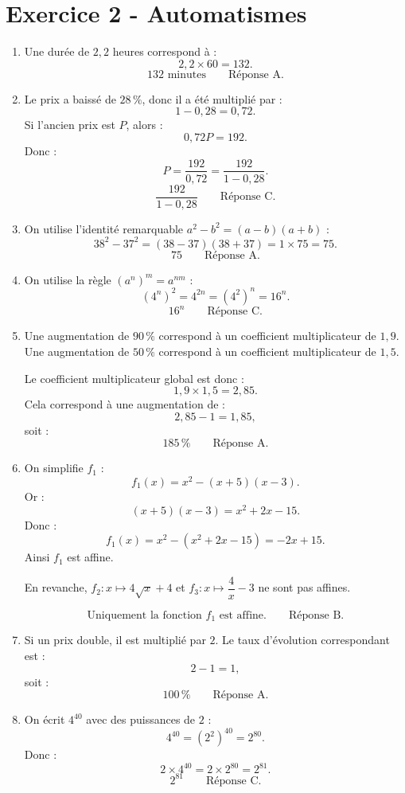 \documentclass[11pt,a4paper]{article}
\begin{document}
\newpage

\section*{Exercice 2 - Automatismes}

\begin{enumerate}[label=\textbf{\arabic*)}, leftmargin=0.75cm, itemsep=0.55cm]

\item Une durée de $2{,}2$ heures correspond à :
\[
2{,}2\times 60=132.
\]
\[
\boxed{132\text{ minutes}} \qquad \text{Réponse A.}
\]

\item Le prix a baissé de $28\,\%$, donc il a été multiplié par :
\[
1-0{,}28=0{,}72.
\]
Si l'ancien prix est $P$, alors :
\[
0{,}72P=192.
\]
Donc :
\[
P=\frac{192}{0{,}72}=\frac{192}{1-0{,}28}.
\]
\[
\boxed{\dfrac{192}{1-0{,}28}} \qquad \text{Réponse C.}
\]

\item On utilise l'identité remarquable $a^2-b^2=(a-b)(a+b)$ :
\[
38^2-37^2=(38-37)(38+37)=1\times75=75.
\]
\[
\boxed{75} \qquad \text{Réponse A.}
\]

\item On utilise la règle $(a^n)^m=a^{nm}$ :
\[
(4^n)^2=4^{2n}=(4^2)^n=16^n.
\]
\[
\boxed{16^n} \qquad \text{Réponse C.}
\]

\item Une augmentation de $90\,\%$ correspond à un coefficient multiplicateur de $1{,}9$.
Une augmentation de $50\,\%$ correspond à un coefficient multiplicateur de $1{,}5$.

Le coefficient multiplicateur global est donc :
\[
1{,}9\times1{,}5=2{,}85.
\]
Cela correspond à une augmentation de :
\[
2{,}85-1=1{,}85,
\]
soit :
\[
\boxed{185\,\%} \qquad \text{Réponse A.}
\]

\item On simplifie $f_1$ :
\[
f_1(x)=x^2-(x+5)(x-3).
\]
Or :
\[
(x+5)(x-3)=x^2+2x-15.
\]
Donc :
\[
f_1(x)=x^2-(x^2+2x-15)=-2x+15.
\]
Ainsi $f_1$ est affine.

En revanche, $f_2:x\mapsto4\sqrt{x}+4$ et $f_3:x\mapsto\dfrac4x-3$ ne sont pas affines.

\[
\boxed{\text{Uniquement la fonction }f_1\text{ est affine.}} \qquad \text{Réponse B.}
\]

\item Si un prix double, il est multiplié par $2$.
Le taux d'évolution correspondant est :
\[
2-1=1,
\]
soit :
\[
\boxed{100\,\%} \qquad \text{Réponse A.}
\]

\item On écrit $4^{40}$ avec des puissances de $2$ :
\[
4^{40}=(2^2)^{40}=2^{80}.
\]
Donc :
\[
2\times4^{40}=2\times2^{80}=2^{81}.
\]
\[
\boxed{2^{81}} \qquad \text{Réponse C.}
\]

\end{enumerate}
\end{document}
